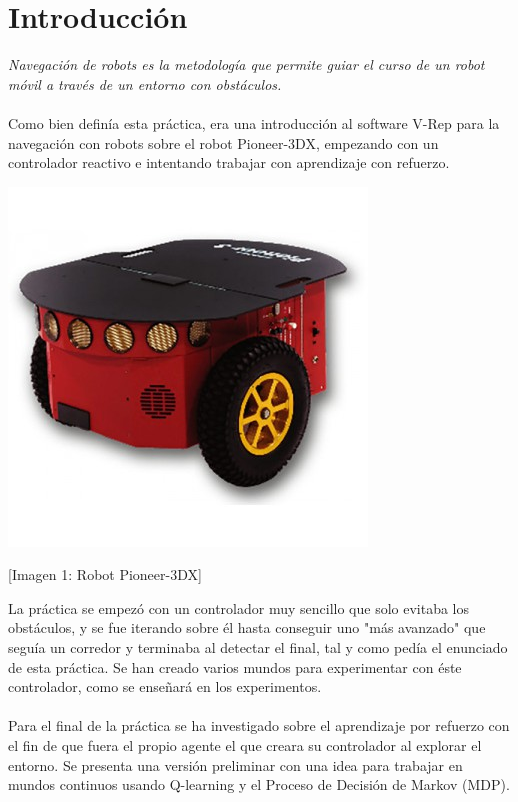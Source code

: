 \documentclass[14pt]{extarticle}
\theoremstyle{definition}
\theoremstyle{remark}
\begin{document}
\section{Introducción}\label{sec:introduccion}
\textit{Navegación de robots es la metodología que permite guiar el curso de un robot móvil a través de un entorno con obstáculos. }\cite{pdf:navegacion_de_robot}
\\\\Como bien definía esta práctica, era una introducción al software V-Rep para la navegación con robots sobre el robot Pioneer-3DX, empezando con un controlador reactivo e intentando trabajar con aprendizaje con refuerzo.\\
\begin{center}
	\includegraphics[scale=0.6]{pioneer.jpg}
\end{center}
\begin{center}
	[Imagen 1: Robot Pioneer-3DX]
\end{center}
La práctica se empezó con un controlador muy sencillo que solo evitaba los obstáculos, y se fue iterando sobre él hasta conseguir uno "más avanzado" que seguía un corredor y terminaba al detectar el final, tal y como pedía el enunciado de esta práctica. Se han creado varios mundos para experimentar con éste controlador, como se enseñará en los experimentos.\\\\
Para el final de la práctica se ha investigado sobre el aprendizaje por refuerzo \cite{pdf:reinforcementlearning} con el fin de que fuera el propio agente el que creara su controlador al explorar el entorno. Se presenta una versión preliminar con una idea para trabajar en mundos continuos usando Q-learning \cite{pdf:qlearning1} \cite{pdf:qlearning2} y el Proceso de Decisión de Markov (MDP).
\end{document}
